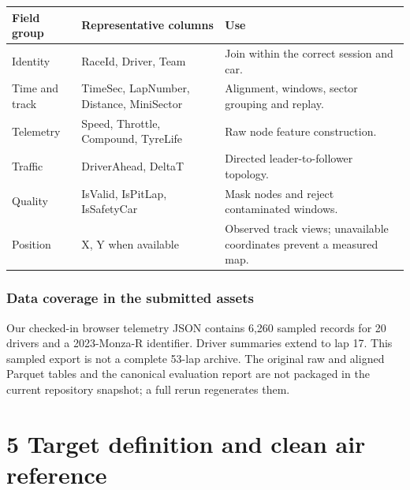 \documentclass[11pt,a4paper,oneside]{report}
\begin{document}
\begin{center}\small\begin{tabularx}{\textwidth}{@{}>{\raggedright\arraybackslash}X>{\raggedright\arraybackslash}X>{\raggedright\arraybackslash}X@{}}

\toprule

Field group & Representative columns & Use \\

\midrule

Identity & RaceId, Driver, Team & Join within the correct session and car. \\

Time and track & TimeSec, LapNumber, Distance, MiniSector & Alignment, windows, sector grouping and replay. \\

Telemetry & Speed, Throttle, Compound, TyreLife & Raw node feature construction. \\

Traffic & DriverAhead, DeltaT & Directed leader-to-follower topology. \\

Quality & IsValid, IsPitLap, IsSafetyCar & Mask nodes and reject contaminated windows. \\

Position & X, Y when available & Observed track views; unavailable coordinates prevent a measured map. \\

\bottomrule\end{tabularx}\end{center}

\subsection*{Data coverage in the submitted assets}

Our checked-in browser telemetry JSON contains 6,260 sampled records for 20 drivers and a 2023-Monza-R identifier. Driver summaries extend to lap 17. This sampled export is not a complete 53-lap archive. The original raw and aligned Parquet tables and the canonical evaluation report are not packaged in the current repository snapshot; a full rerun regenerates them.

\clearpage

\clearpage\chapter*{5 Target definition and clean air reference}
\end{document}
